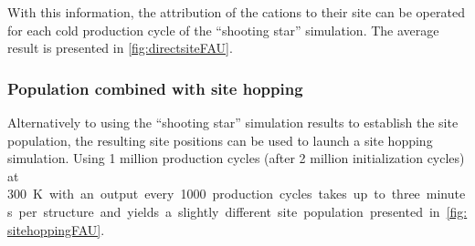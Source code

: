 \documentclass[main.tex]{subfiles}
\begin{document}
With this information, the attribution of the cations to their site can be operated for each cold production cycle of the ``shooting star'' simulation. The average result is presented in \cref{fig:directsiteFAU}.

\subsubsection{Population combined with site hopping}

Alternatively to using the ``shooting star'' simulation results to establish the site population, the resulting site positions can be used to launch a site hopping simulation. Using 1 million production cycles (after 2 million initialization cycles) at \qty{300}K with an output every 1000 production cycles takes up to three minutes per structure and yields a slightly different site population presented in \cref{fig:sitehoppingFAU}.
\end{document}
